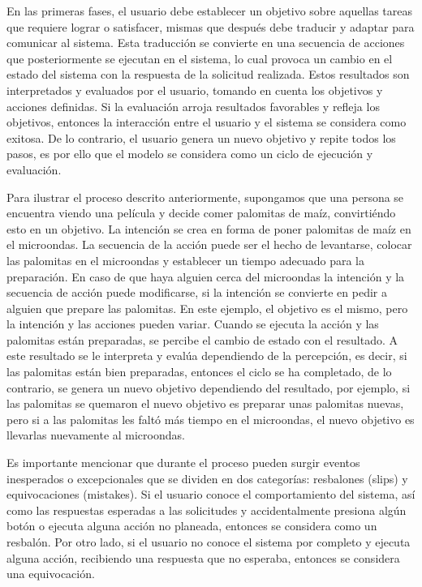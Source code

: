 En las primeras fases, el usuario debe establecer un objetivo sobre aquellas tareas que requiere lograr o satisfacer, mismas que después debe traducir y adaptar para comunicar al sistema. Esta traducción se convierte en una secuencia de acciones que posteriormente se ejecutan en el sistema, lo cual provoca un cambio en el estado del sistema con la respuesta de la solicitud realizada. Estos resultados son interpretados y evaluados por el usuario, tomando en cuenta los objetivos y acciones definidas. Si la evaluación arroja resultados favorables y refleja los objetivos, entonces la interacción entre el usuario y el sistema se considera como exitosa. De lo contrario, el usuario genera un nuevo objetivo y repite todos los pasos, es por ello que el modelo se considera como un ciclo de ejecución y evaluación.

Para ilustrar el proceso descrito anteriormente, supongamos que una persona se encuentra viendo una película y decide comer palomitas de maíz, convirtiéndo esto en un objetivo. La intención se crea en forma de poner palomitas de maíz en el microondas. La secuencia de la acción puede ser el hecho de levantarse, colocar las palomitas en el microondas y establecer un tiempo adecuado para la preparación. En caso de que haya alguien cerca del microondas la intención y la secuencia de acción puede modificarse, si la intención se convierte en pedir a alguien que prepare las palomitas. En este ejemplo, el objetivo es el mismo, pero la intención y las acciones pueden variar. Cuando se ejecuta la acción y las palomitas están preparadas, se percibe el cambio de estado con el resultado. A este resultado se le interpreta y evalúa dependiendo de la percepción, es decir, si las palomitas están bien preparadas, entonces el ciclo se ha completado, de lo contrario, se genera un nuevo objetivo dependiendo del resultado, por ejemplo, si las palomitas se quemaron el nuevo objetivo es preparar unas palomitas nuevas, pero si a las palomitas les faltó más tiempo en el microondas, el nuevo objetivo es llevarlas nuevamente al microondas.

Es importante mencionar que durante el proceso pueden surgir eventos inesperados o excepcionales que se dividen en dos categorías: resbalones (slips) y equivocaciones (mistakes). Si el usuario conoce el comportamiento del sistema, así como las respuestas esperadas a las solicitudes y accidentalmente presiona algún botón o ejecuta alguna acción no planeada, entonces se considera como un resbalón. Por otro lado, si el usuario no conoce el sistema por completo y ejecuta alguna acción, recibiendo una respuesta que no esperaba, entonces se considera una equivocación.

